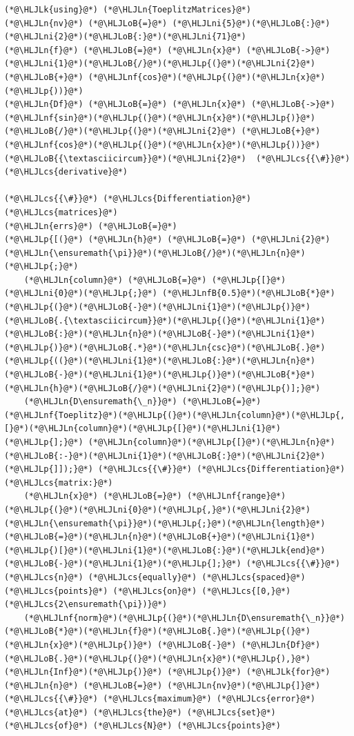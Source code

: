 \documentclass[12pt,landscape]{article}
\newcommand{\HLJLk}[1]{\textcolor[RGB]{148,91,176}{\textbf{#1}}}
\newcommand{\HLJLn}[1]{#1}
\newcommand{\HLJLnf}[1]{\textcolor[RGB]{66,102,213}{#1}}
\newcommand{\HLJLnfB}[1]{\textcolor[RGB]{59,151,46}{#1}}
\newcommand{\HLJLni}[1]{\textcolor[RGB]{59,151,46}{#1}}
\newcommand{\HLJLoB}[1]{\textcolor[RGB]{102,102,102}{\textbf{#1}}}
\newcommand{\HLJLp}[1]{#1}
\newcommand{\HLJLcs}[1]{\textcolor[RGB]{153,153,119}{\textit{#1}}}
\begin{document}
{\begin{lstlisting}
(*@\HLJLk{using}@*) (*@\HLJLn{ToeplitzMatrices}@*)
(*@\HLJLn{nv}@*) (*@\HLJLoB{=}@*) (*@\HLJLni{5}@*)(*@\HLJLoB{:}@*)(*@\HLJLni{2}@*)(*@\HLJLoB{:}@*)(*@\HLJLni{71}@*)
(*@\HLJLn{f}@*) (*@\HLJLoB{=}@*) (*@\HLJLn{x}@*) (*@\HLJLoB{->}@*) (*@\HLJLni{1}@*)(*@\HLJLoB{/}@*)(*@\HLJLp{(}@*)(*@\HLJLni{2}@*) (*@\HLJLoB{+}@*) (*@\HLJLnf{cos}@*)(*@\HLJLp{(}@*)(*@\HLJLn{x}@*)(*@\HLJLp{))}@*)
(*@\HLJLn{Df}@*) (*@\HLJLoB{=}@*) (*@\HLJLn{x}@*) (*@\HLJLoB{->}@*) (*@\HLJLnf{sin}@*)(*@\HLJLp{(}@*)(*@\HLJLn{x}@*)(*@\HLJLp{)}@*)(*@\HLJLoB{/}@*)(*@\HLJLp{(}@*)(*@\HLJLni{2}@*) (*@\HLJLoB{+}@*) (*@\HLJLnf{cos}@*)(*@\HLJLp{(}@*)(*@\HLJLn{x}@*)(*@\HLJLp{))}@*)(*@\HLJLoB{{\textasciicircum}}@*)(*@\HLJLni{2}@*)  (*@\HLJLcs{{\#}}@*) (*@\HLJLcs{derivative}@*)

(*@\HLJLcs{{\#}}@*) (*@\HLJLcs{Differentiation}@*) (*@\HLJLcs{matrices}@*)
(*@\HLJLn{errs}@*) (*@\HLJLoB{=}@*) 
(*@\HLJLp{[(}@*) (*@\HLJLn{h}@*) (*@\HLJLoB{=}@*) (*@\HLJLni{2}@*)(*@\HLJLn{\ensuremath{\pi}}@*)(*@\HLJLoB{/}@*)(*@\HLJLn{n}@*)(*@\HLJLp{;}@*)
    (*@\HLJLn{column}@*) (*@\HLJLoB{=}@*) (*@\HLJLp{[}@*)(*@\HLJLni{0}@*)(*@\HLJLp{;}@*) (*@\HLJLnfB{0.5}@*)(*@\HLJLoB{*}@*)(*@\HLJLp{(}@*)(*@\HLJLoB{-}@*)(*@\HLJLni{1}@*)(*@\HLJLp{)}@*)(*@\HLJLoB{.{\textasciicircum}}@*)(*@\HLJLp{(}@*)(*@\HLJLni{1}@*)(*@\HLJLoB{:}@*)(*@\HLJLn{n}@*)(*@\HLJLoB{-}@*)(*@\HLJLni{1}@*)(*@\HLJLp{)}@*)(*@\HLJLoB{.*}@*)(*@\HLJLn{csc}@*)(*@\HLJLoB{.}@*)(*@\HLJLp{((}@*)(*@\HLJLni{1}@*)(*@\HLJLoB{:}@*)(*@\HLJLn{n}@*)(*@\HLJLoB{-}@*)(*@\HLJLni{1}@*)(*@\HLJLp{)}@*)(*@\HLJLoB{*}@*)(*@\HLJLn{h}@*)(*@\HLJLoB{/}@*)(*@\HLJLni{2}@*)(*@\HLJLp{)];}@*)
    (*@\HLJLn{D\ensuremath{\_n}}@*) (*@\HLJLoB{=}@*) (*@\HLJLnf{Toeplitz}@*)(*@\HLJLp{(}@*)(*@\HLJLn{column}@*)(*@\HLJLp{,[}@*)(*@\HLJLn{column}@*)(*@\HLJLp{[}@*)(*@\HLJLni{1}@*)(*@\HLJLp{];}@*) (*@\HLJLn{column}@*)(*@\HLJLp{[}@*)(*@\HLJLn{n}@*)(*@\HLJLoB{:-}@*)(*@\HLJLni{1}@*)(*@\HLJLoB{:}@*)(*@\HLJLni{2}@*)(*@\HLJLp{]]);}@*) (*@\HLJLcs{{\#}}@*) (*@\HLJLcs{Differentiation}@*) (*@\HLJLcs{matrix:}@*)
    (*@\HLJLn{x}@*) (*@\HLJLoB{=}@*) (*@\HLJLnf{range}@*)(*@\HLJLp{(}@*)(*@\HLJLni{0}@*)(*@\HLJLp{,}@*)(*@\HLJLni{2}@*)(*@\HLJLn{\ensuremath{\pi}}@*)(*@\HLJLp{;}@*)(*@\HLJLn{length}@*)(*@\HLJLoB{=}@*)(*@\HLJLn{n}@*)(*@\HLJLoB{+}@*)(*@\HLJLni{1}@*)(*@\HLJLp{)[}@*)(*@\HLJLni{1}@*)(*@\HLJLoB{:}@*)(*@\HLJLk{end}@*)(*@\HLJLoB{-}@*)(*@\HLJLni{1}@*)(*@\HLJLp{];}@*) (*@\HLJLcs{{\#}}@*) (*@\HLJLcs{n}@*) (*@\HLJLcs{equally}@*) (*@\HLJLcs{spaced}@*) (*@\HLJLcs{points}@*) (*@\HLJLcs{on}@*) (*@\HLJLcs{[0,}@*) (*@\HLJLcs{2\ensuremath{\pi})}@*)
    (*@\HLJLnf{norm}@*)(*@\HLJLp{(}@*)(*@\HLJLn{D\ensuremath{\_n}}@*)(*@\HLJLoB{*}@*)(*@\HLJLn{f}@*)(*@\HLJLoB{.}@*)(*@\HLJLp{(}@*)(*@\HLJLn{x}@*)(*@\HLJLp{)}@*) (*@\HLJLoB{-}@*) (*@\HLJLn{Df}@*)(*@\HLJLoB{.}@*)(*@\HLJLp{(}@*)(*@\HLJLn{x}@*)(*@\HLJLp{),}@*)(*@\HLJLn{Inf}@*)(*@\HLJLp{)}@*) (*@\HLJLp{)}@*) (*@\HLJLk{for}@*) (*@\HLJLn{n}@*) (*@\HLJLoB{=}@*) (*@\HLJLn{nv}@*)(*@\HLJLp{]}@*) (*@\HLJLcs{{\#}}@*) (*@\HLJLcs{maximum}@*) (*@\HLJLcs{error}@*) (*@\HLJLcs{at}@*) (*@\HLJLcs{the}@*) (*@\HLJLcs{set}@*) (*@\HLJLcs{of}@*) (*@\HLJLcs{N}@*) (*@\HLJLcs{points}@*)


\end{lstlisting}}
\end{document}
